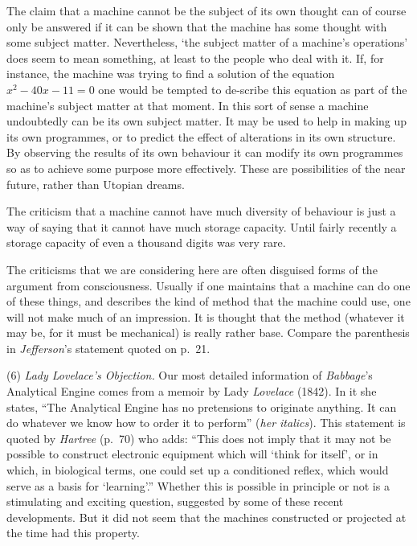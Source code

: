 \documentclass[10pt]{article} %
\begin{document}
The claim that a machine cannot be the subject of its own thought can of course only be answered if it can be shown that the machine has some thought with some subject matter. Nevertheless, `the subject matter of a machine's operations' does seem to mean something, at least to the people who deal with it. If, for instance, the machine was trying to find a solution of the equation $x^2 - 40x - 11 = 0$ one would be tempted to de-scribe this equation as part of the machine's subject matter at that moment. In this sort of sense a machine undoubtedly can be its own subject matter. It may be used to help in making up its own programmes, or to predict the effect of alterations in its own structure. By observing the results of its own behaviour it can modify its own programmes so as to achieve some purpose more effectively. These are possibilities of the near future, rather than Utopian dreams.

The criticism that a machine cannot have much diversity of behaviour is just a way of saying that it cannot have much storage capacity. Until fairly recently a storage capacity of even a thousand digits was very rare.

The criticisms that we are considering here are often disguised forms of the argument from consciousness. Usually if one maintains that a machine can do one of these things, and describes the kind of method that the machine could use, one will not make much of an impression. It is thought that the method (whatever it may be, for it must be mechanical) is really rather base. Compare the parenthesis in \textit{Jefferson}'s statement quoted on p.~21.

\vspace{0.5\baselineskip} %
\noindent\normalfont (6) \textit{Lady Lovelace's Objection.} Our most detailed information of \textit{Babbage}'s Analytical Engine comes from a memoir by Lady \textit{Lovelace} (1842). In it she states, ``The Analytical Engine has no pretensions to originate anything. It can do whatever we know how to order it to perform'' (\textit{her italics}). This statement is quoted by \textit{Hartree} (p.~70) who adds: ``This does not imply that it may not be possible to construct electronic equipment which will `think for itself', or in which, in biological terms, one could set up a conditioned reflex, which would serve as a basis for `learning'.'' Whether this is possible in principle or not is a stimulating and exciting question, suggested by some of these recent developments. But it did not seem that the machines constructed or projected at the time had this property.
\end{document}

